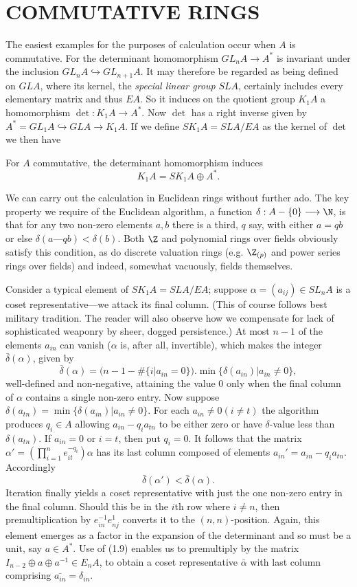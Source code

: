 \section*{COMMUTATIVE RINGS}
The easiest examples for the purposes of calculation occur when $A$ is commutative. For the determinant homomorphism $GL_nA\longrightarrow A^*$ is invariant under the inclusion $GL_nA\hookrightarrow GL_{n+1}A$. It may therefore be regarded as being defined on $GLA$, where its kernel, the {\em special linear group} $SLA$, certainly includes every elementary matrix and thus $EA$. So it induces on the quotient group $K_1A$ a homomorphism $\det:K_1A\longrightarrow A^*$. Now $\det$ has a right inverse given by $A^*=GL_1A\hookrightarrow GLA\longrightarrow K_1A$. If we define $SK_1A=SLA/EA$ as the kernel of $\det$ we then have
\begin{prop}
For $A$ commutative, the determinant homomorphism induces
\[K_1A=SK_1A\oplus A^*.\]
\end{prop}

We can carry out the calculation in Euclidean rings without further ado. The key property we require of the Euclidean algorithm, a function $\delta:A-\{0\}\longrightarrow \N$, is that for any two non-zero elements $a,b$ there is a third, $q$ say, with either $a=qb$ or else $\delta(a—qb)<\delta(b)$. Both $\Z$ and polynomial rings over fields obviously satisfy this condition, as do discrete valuation rings (e.g. $\Z_{(p)}$ and power series rings over fields) and indeed, somewhat vacuously, fields themselves.

Consider a typical element of $SK_1A=SLA/EA$; suppose $\alpha=(a_{ij})\in SL_nA$ is a coset representative---we attack its final column. (This of course follows best military tradition. The reader will also observe how we compensate for lack of sophisticated weaponry by sheer, dogged persistence.) At most $n-1$ of the elements $a_{in}$ can vanish ($\alpha$ is, after all, invertible), which makes the integer $\bar{\delta}(\alpha)$, given by
\[\bar{\delta}(\alpha)=(n-1-\#\{i|a_{in}=0\}).\min\{\delta(a_{in})|a_{in}\neq 0\},\]
well-defined and non-negative, attaining the value $0$ only when the final column of $\alpha$ contains a single non-zero entry. Now suppose $\delta(a_{tn})=\min \{\delta(a_{in})|a_{in}\neq 0\}$. For each $a_{in}\neq 0 (i\neq t)$ the algorithm produces $q_i\in A$ allowing $a_{in}-q_ia_{tn}$ to be either zero or have $\delta$-value less than $\delta(a_{tn})$. If $a_{in}=0$ or $i=t$, then put $q_i=0$. It follows that the matrix $\alpha'=(\prod_{i=1}^n e_{it}^{-q_i})\alpha$ has its last column composed of elements $a_{in}'=a_{in}-q_ia_{tn}$. Accordingly
\[\bar{\delta}(\alpha')< \bar{\delta}(\alpha).\]
Iteration finally yields a coset representative with just the one non-zero entry in the final column. Should this be in the $i$th row where $i\neq n$, then premultiplication by $e_{in}^{-1}e_{nj}^1$ converts it to the $(n,n)$-position. Again, this element emerges as a factor in the expansion of the determinant and so must be a unit, say $a\in A^*$. Use of (1.9) enables us to premultiply by the matrix $I_{n-2}\oplus a\oplus a^{-1}\in E_nA$, to obtain a coset representative $\bar{\alpha}$ with last column comprising $\bar{a_{in}}=\delta_{in}$.

